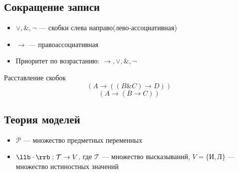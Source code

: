 \documentclass[english]{article}
\begin{document}
\subsection{Сокращение записи}
\label{sec:orgc8e0dc1}
\begin{itemize}
	\item \(\vee, \&, \neg\) --- скобки слева направо(лево-ассоциативная)
	\item \(\to\) --- правоассоциативная
	\item Приоритет по возрастанию: \(\to, \vee, \&, \neg\)
\end{itemize}
\begin{examp}
	Расставление скобок
	\[ \left(A \to \left( \left(B \& C\right) \to D\right)\right) \]
	\[ \left(A \to \left(B \to C\right)\right) \]
\end{examp}
\subsection{Теория моделей}
\label{sec:org9810c92}
\begin{itemize}
	\item \(\mathcal{P}\) --- множество предметных переменных
	\item \(\llb\cdot\rrb: \mathcal{T} \to V\), где \(\mathcal{T}\) --- множество высказываний, \(V = \{\text{И}, \text{Л}\}\) --- множество истиностных значений
\end{itemize}
\end{document}
